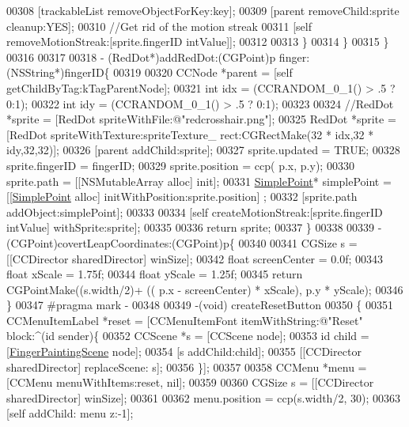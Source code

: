\begin{DoxyCode}
{{{{{{{{{{{{00308             [trackableList removeObjectForKey:key];
00309             [parent removeChild:sprite cleanup:YES];
00310             \textcolor{comment}{//Get rid of the motion streak}
00311             [\textcolor{keyword}{self} removeMotionStreak:[sprite.fingerID intValue]];
00312             
00313         \}
00314     \}
00315 \}
00316 
00317 
00318 - (RedDot*)addRedDot:(CGPoint)p finger:(NSString*)fingerID\{
00319     
00320     CCNode *parent = [\textcolor{keyword}{self} getChildByTag:kTagParentNode];
00321     \textcolor{keywordtype}{int} idx = (CCRANDOM\_0\_1() > .5 ? 0:1);
00322     \textcolor{keywordtype}{int} idy = (CCRANDOM\_0\_1() > .5 ? 0:1);
00323     
00324     \textcolor{comment}{//RedDot *sprite = [RedDot spriteWithFile:@"redcrosshair.png"];}
00325     RedDot *sprite = [RedDot spriteWithTexture:spriteTexture\_ rect:CGRectMake(32 * idx,32 * idy,32,32)];
00326     [parent addChild:sprite];
00327     sprite.updated = TRUE;
00328     sprite.fingerID = fingerID;
00329     sprite.position = ccp( p.x, p.y);
00330     sprite.path = [[NSMutableArray alloc] init];
00331     \hyperlink{interface_simple_point}{SimplePoint}* simplePoint = [[\hyperlink{interface_simple_point}{SimplePoint} alloc] initWithPosition:sprite.position]
      ;
00332     [sprite.path addObject:simplePoint];
00333     
00334     [\textcolor{keyword}{self} createMotionStreak:[sprite.fingerID intValue] withSprite:sprite];
00335     
00336     \textcolor{keywordflow}{return} sprite;
00337 \}
00338 
00339 - (CGPoint)covertLeapCoordinates:(CGPoint)p\{
00340     
00341     CGSize s = [[CCDirector sharedDirector] winSize];
00342     \textcolor{keywordtype}{float} screenCenter = 0.0f;
00343     \textcolor{keywordtype}{float} xScale = 1.75f;
00344     \textcolor{keywordtype}{float} yScale = 1.25f;
00345     \textcolor{keywordflow}{return} CGPointMake((s.width/2)+ (( p.x - screenCenter) * xScale), p.y * yScale);
00346 \}
00347 \textcolor{preprocessor}{#pragma mark -}
00348 \textcolor{preprocessor}{}
00349 -(void) createResetButton
00350 \{
00351     CCMenuItemLabel *reset = [CCMenuItemFont itemWithString:@"Reset" block:^(id sender)\{
00352         CCScene *s = [CCScene node];
00353         id child = [\hyperlink{interface_finger_painting_scene}{FingerPaintingScene} node];
00354         [s addChild:child];
00355         [[CCDirector sharedDirector] replaceScene: s];
00356     \}];
00357     
00358     CCMenu *menu = [CCMenu menuWithItems:reset, nil];
00359     
00360     CGSize s = [[CCDirector sharedDirector] winSize];
00361     
00362     menu.position = ccp(s.width/2, 30);
00363     [\textcolor{keyword}{self} addChild: menu z:-1];
}}}}}}}}}}}}
\end{DoxyCode}

